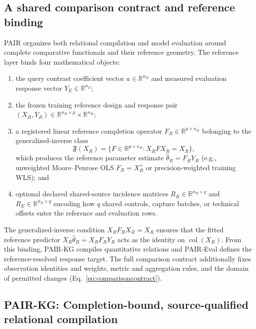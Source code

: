 \documentclass[preprint,12pt,number,sort&compress]{elsarticle}
\newcommand{\method}{PAIR\xspace}
\newcommand{\pairkg}{PAIR-KG\xspace}
\newcommand{\paireval}{PAIR-Eval\xspace}
\newcommand{\R}{\mathbb{R}}
\DeclareMathOperator{\col}{col}
\begin{document}
\subsection{A shared comparison contract and reference binding}
\method organizes both relational compilation and model evaluation around complete comparative functionals and their reference geometry. The reference layer binds four mathematical objects:
\begin{enumerate}[label=(\roman*)]
\item the query contrast coefficient vector $a \in \R^{n_E}$ and measured evaluation response vector $Y_E \in \R^{n_E}$;
\item the frozen training reference design and response pair $(X_R, Y_R) \in \R^{n_R \times p} \times \R^{n_R}$;
\item a registered linear reference completion operator $F_R \in \R^{p \times n_R}$ belonging to the generalized-inverse class
\[
\mathfrak{F}(X_R) = \{F \in \R^{p \times n_R} : X_R F X_R = X_R\},
\]
which produces the reference parameter estimate $\widehat{\theta}_R = F_R Y_R$ (e.g., unweighted Moore--Penrose OLS $F_R = X_R^+$ or precision-weighted training WLS); and
\item optional declared shared-source incidence matrices $R_R \in \R^{n_R \times q}$ and $R_E \in \R^{n_E \times q}$ encoding how $q$ shared controls, capture batches, or technical offsets enter the reference and evaluation rows.
\end{enumerate}
The generalized-inverse condition $X_R F_R X_R = X_R$ ensures that the fitted reference predictor $X_R \widehat{\theta}_R = X_R F_R Y_R$ acts as the identity on $\col(X_R)$. From this binding, \pairkg compiles quantitative relations and \paireval defines the reference-resolved response target. The full comparison contract additionally fixes observation identities and weights, metric and aggregation rules, and the domain of permitted changes (Eq.~\eqref{eq:comparisoncontract}).

\subsection{\pairkg: Completion-bound, source-qualified relational compilation}\label{subsec:kg}
\end{document}
